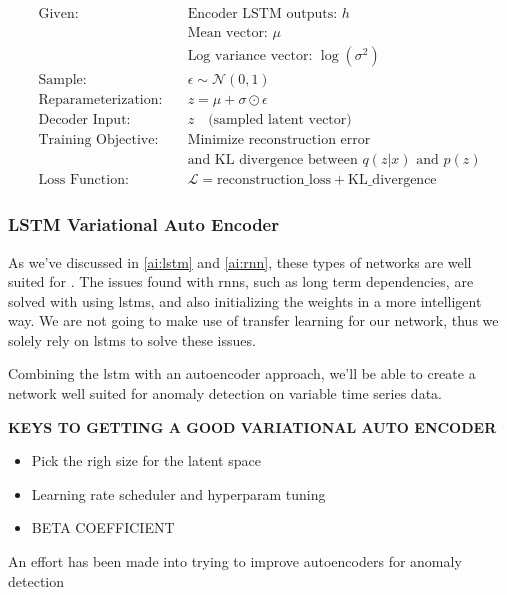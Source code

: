 \begin{align*}
\text{Given:} & \quad \text{Encoder LSTM outputs: } h \\
& \quad \text{Mean vector: } \mu \\
& \quad \text{Log variance vector: } \log(\sigma^2) \\
\text{Sample:} & \quad \epsilon \sim \mathcal{N}(0, 1) \\
\text{Reparameterization:} & \quad z = \mu + \sigma \odot \epsilon \\
\text{Decoder Input:} & \quad z \quad \text{(sampled latent vector)} \\
\text{Training Objective:} & \quad \text{Minimize reconstruction error} \\
& \quad \text{and KL divergence between } q(z|x) \text{ and } p(z) \\
\text{Loss Function:} & \quad \mathcal{L} = \text{reconstruction\_loss} + \text{KL\_divergence}
\end{align*}




\subsubsection{LSTM Variational Auto Encoder}

As we've discussed in \ref{ai:lstm} and \ref{ai:rnn}, these types of networks are well suited for . The issues found with \acrshort{rnn}s, such as long term dependencies, are solved with using \acrshort{lstm}s, and also initializing the weights in a more intelligent way. We are not going to make use of transfer learning for our network, thus we solely rely on \acrshort{lstm}s to solve these issues.

Combining the \acrshort{lstm} with an autoencoder approach, we'll be able to create a network well suited for anomaly detection on variable time series data.

\textbf{KEYS TO GETTING A GOOD VARIATIONAL AUTO ENCODER}

\begin{itemize}
    \item Pick the righ size for the latent space
    \item Learning rate scheduler  and hyperparam tuning 
    \item BETA COEFFICIENT
\end{itemize}

An effort has been made into trying to improve autoencoders for anomaly detection \cite{tan2023improving}